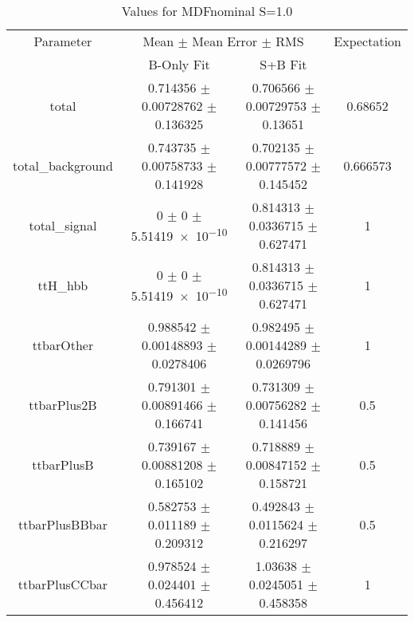 \begin{table}
\centering
\caption{Values for MDFnominal S=1.0}
\begin{tabular}{cccc}
\toprule
Parameter & \multicolumn{2}{c}{Mean $\pm$ Mean Error $\pm$ RMS} & Expectation\\
 & B-Only Fit & S+B Fit & \\
\midrule
total & \num{0.714356} $\pm$ \num{0.00728762} $\pm$ \num{0.136325} & \num{0.706566} $\pm$ \num{0.00729753} $\pm$ \num{0.13651} & \num{0.68652}\\
total\_background & \num{0.743735} $\pm$ \num{0.00758733} $\pm$ \num{0.141928} & \num{0.702135} $\pm$ \num{0.00777572} $\pm$ \num{0.145452} & \num{0.666573}\\
total\_signal & \num{0} $\pm$ \num{0} $\pm$ \num{5.51419e-10} & \num{0.814313} $\pm$ \num{0.0336715} $\pm$ \num{0.627471} & \num{1}\\
ttH\_hbb & \num{0} $\pm$ \num{0} $\pm$ \num{5.51419e-10} & \num{0.814313} $\pm$ \num{0.0336715} $\pm$ \num{0.627471} & \num{1}\\
ttbarOther & \num{0.988542} $\pm$ \num{0.00148893} $\pm$ \num{0.0278406} & \num{0.982495} $\pm$ \num{0.00144289} $\pm$ \num{0.0269796} & \num{1}\\
ttbarPlus2B & \num{0.791301} $\pm$ \num{0.00891466} $\pm$ \num{0.166741} & \num{0.731309} $\pm$ \num{0.00756282} $\pm$ \num{0.141456} & \num{0.5}\\
ttbarPlusB & \num{0.739167} $\pm$ \num{0.00881208} $\pm$ \num{0.165102} & \num{0.718889} $\pm$ \num{0.00847152} $\pm$ \num{0.158721} & \num{0.5}\\
ttbarPlusBBbar & \num{0.582753} $\pm$ \num{0.011189} $\pm$ \num{0.209312} & \num{0.492843} $\pm$ \num{0.0115624} $\pm$ \num{0.216297} & \num{0.5}\\
ttbarPlusCCbar & \num{0.978524} $\pm$ \num{0.024401} $\pm$ \num{0.456412} & \num{1.03638} $\pm$ \num{0.0245051} $\pm$ \num{0.458358} & \num{1}\\
\bottomrule
\end{tabular}
\end{table}